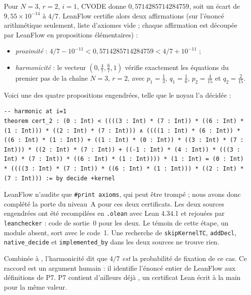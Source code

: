 Pour $N=3$, $r=2$, $i=1$, CVODE donne $0{,}5714285714284759$, soit un écart de $9{,}55\times10^{-14}$ à $4/7$.
LeanFlow certifie alors deux affirmations \tierA{} (sur l'énoncé arithmétique seulement, liste d'axiomes vide ; chaque affirmation est découpée par LeanFlow en propositions élémentaires) :
\begin{itemize}
\item \emph{proximité} : $4/7-10^{-11}<0{,}5714285714284759<4/7+10^{-11}$ ;
\item \emph{harmonicité} : le vecteur $(0,\tfrac47,\tfrac67,1)$ vérifie exactement les équations du premier pas de la
chaîne $N=3$, $r=2$, avec $p_1=\tfrac13$, $q_1=\tfrac16$, $p_2=\tfrac4{15}$ et $q_2=\tfrac2{15}$.
\end{itemize}
Voici une des quatre propositions engendrées, telle que le noyau l'a décidée :
\begin{lstlisting}[language=Lean]
-- harmonic at i=1
theorem cert_2 : (0 : Int) < ((((3 : Int) * (7 : Int)) * ((6 : Int) * (1 : Int))) * ((2 : Int) * (7 : Int))) ∧ ((((1 : Int) * (6 : Int)) * ((6 : Int) * (1 : Int)) + ((1 : Int) * (0 : Int)) * ((3 : Int) * (7 : Int))) * ((2 : Int) * (7 : Int)) + ((-1 : Int) * (4 : Int)) * (((3 : Int) * (7 : Int)) * ((6 : Int) * (1 : Int)))) * (1 : Int) = (0 : Int) * ((((3 : Int) * (7 : Int)) * ((6 : Int) * (1 : Int))) * ((2 : Int) * (7 : Int))) := by decide +kernel
\end{lstlisting}
LeanFlow n'audite que \texttt{\#print axioms}, qui peut être trompé ; nous avons donc complété la porte du
niveau~A pour ces deux certificats. Les deux sources engendrées ont été recompilées en \texttt{.olean} avec Lean
4.34.1 et rejouées par \texttt{leanchecker} : code de sortie~0 pour les deux. Le témoin de cette étape, un module
absent, sort avec le code~1. Une recherche de \texttt{skipKernelTC}, \texttt{addDecl}, \texttt{native\_decide} et
\texttt{implemented\_by} dans les deux sources ne trouve rien.

Combinée à , l'harmonicité dit que $4/7$ \emph{est} la probabilité de fixation de ce cas.
Ce raccord est un argument humain \tierC{} : il identifie l'énoncé entier de LeanFlow aux définitions
 de P7. P7 contient d'ailleurs déjà , un certificat Lean écrit à la main pour la même
valeur.

